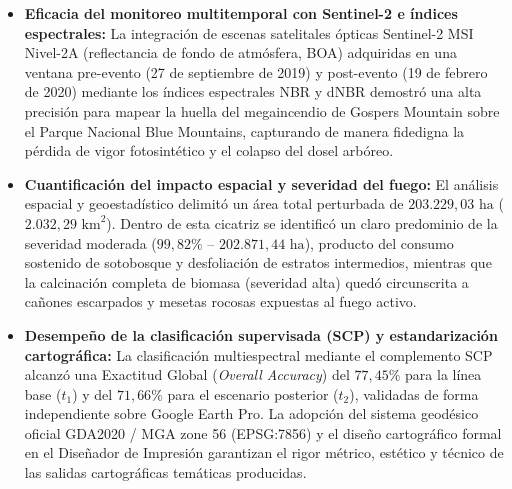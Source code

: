 \documentclass[12pt]{article}
\begin{document}
\begin{itemize}
    \item \textbf{Eficacia del monitoreo multitemporal con Sentinel-2 e índices espectrales:} La integración de escenas satelitales ópticas Sentinel-2 MSI Nivel-2A (reflectancia de fondo de atmósfera, BOA) adquiridas en una ventana pre-evento (27 de septiembre de 2019) y post-evento (19 de febrero de 2020) mediante los índices espectrales NBR y dNBR demostró una alta precisión para mapear la huella del megaincendio de Gospers Mountain sobre el Parque Nacional Blue Mountains, capturando de manera fidedigna la pérdida de vigor fotosintético y el colapso del dosel arbóreo.

    \item \textbf{Cuantificación del impacto espacial y severidad del fuego:} El análisis espacial y geoestadístico delimitó un área total perturbada de $203.229{,}03\text{ ha}$ ($2.032{,}29\text{ km}^2$). Dentro de esta cicatriz se identificó un claro predominio de la severidad moderada ($99{,}82\%$ -- $202.871{,}44\text{ ha}$), producto del consumo sostenido de sotobosque y desfoliación de estratos intermedios, mientras que la calcinación completa de biomasa (severidad alta) quedó circunscrita a cañones escarpados y mesetas rocosas expuestas al fuego activo.

    \item \textbf{Desempeño de la clasificación supervisada (SCP) y estandarización cartográfica:} La clasificación multiespectral mediante el complemento SCP alcanzó una Exactitud Global (\textit{Overall Accuracy}) del $77{,}45\%$ para la línea base ($t_1$) y del $71{,}66\%$ para el escenario posterior ($t_2$), validadas de forma independiente sobre Google Earth Pro. La adopción del sistema geodésico oficial GDA2020 / MGA zone 56 (EPSG:7856) y el diseño cartográfico formal en el Diseñador de Impresión garantizan el rigor métrico, estético y técnico de las salidas cartográficas temáticas producidas.
\end{itemize}



\end{document}
